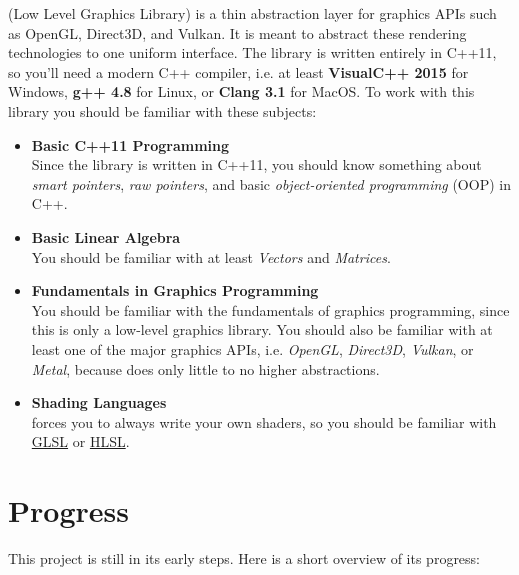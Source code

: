 \documentclass{article}
\begin{document}
\LLGL (Low Level Graphics Library) is a thin abstraction layer for graphics APIs such as
OpenGL, Direct3D, and Vulkan. It is meant to abstract these rendering technologies to one uniform interface.
The library is written entirely in C++11, so you'll
need a modern C++ compiler, i.e. at least \textbf{VisualC++ 2015} for Windows,
\textbf{g++ 4.8} for Linux, or \textbf{Clang 3.1} for MacOS.
To work with this library you should be familiar with these subjects:
\begin{itemize}
	\item \textbf{Basic C++11 Programming} \\
	Since the library is written in C++11, you should know something about \emph{smart pointers},
	\emph{raw pointers}, and basic \emph{object-oriented programming} (OOP) in C++.
	
	\item \textbf{Basic Linear Algebra} \\
	You should be familiar with at least \emph{Vectors} and \emph{Matrices}.
	
	\item \textbf{Fundamentals in Graphics Programming} \\
	You should be familiar with the fundamentals of graphics programming, since this is only a low-level graphics library.
	You should also be familiar with at least one of the major graphics APIs,
	i.e. \emph{OpenGL}, \emph{Direct3D}, \emph{Vulkan}, or \emph{Metal},
	because \LLGL does only little to no higher abstractions.
	
	\item \textbf{Shading Languages} \\
	\LLGL forces you to always write your own shaders, so you should be familiar with
	\href{https://www.opengl.org/documentation/glsl/}{GLSL} or
	\href{https://msdn.microsoft.com/de-de/library/windows/desktop/bb509561(v=vs.85).aspx}{HLSL}.
\end{itemize}



\newpage
\section{Progress}

This project is still in its early steps. Here is a short overview of its progress:
\end{document}
